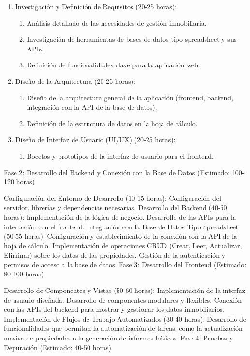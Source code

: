 \begin{enumerate}
    \item Investigación y Definición de Requisitos (20-25 horas):
    \begin{enumerate}
        \item Análisis detallado de las necesidades de gestión inmobiliaria.
        \item Investigación de herramientas de bases de datos tipo spreadsheet y sus APIs.
        \item Definición de funcionalidades clave para la aplicación web.
    \end{enumerate}
    \item Diseño de la Arquitectura (20-25 horas):
    \begin{enumerate}
    \item Diseño de la arquitectura general de la aplicación (frontend, backend, integración con la API de la base de datos).
    \item Definición de la estructura de datos en la hoja de cálculo.
    \end{enumerate}
    \item Diseño de Interfaz de Usuario (UI/UX) (20-25 horas):
    \begin{enumerate}
    \item Bocetos y prototipos de la interfaz de usuario para el frontend.
    \end{enumerate}
\end{enumerate}

Fase 2: Desarrollo del Backend y Conexión con la Base de Datos (Estimado: 100-120 horas)

Configuración del Entorno de Desarrollo (10-15 horas):
Configuración del servidor, librerías y dependencias necesarias.
Desarrollo del Backend (40-50 horas):
Implementación de la lógica de negocio.
Desarrollo de las APIs para la interacción con el frontend.
Integración con la Base de Datos Tipo Spreadsheet (50-55 horas):
Configuración y establecimiento de la conexión con la API de la hoja de cálculo.
Implementación de operaciones CRUD (Crear, Leer, Actualizar, Eliminar) sobre los datos de las propiedades.
Gestión de la autenticación y permisos de acceso a la base de datos.
Fase 3: Desarrollo del Frontend (Estimado: 80-100 horas)

Desarrollo de Componentes y Vistas (50-60 horas):
Implementación de la interfaz de usuario diseñada.
Desarrollo de componentes modulares y flexibles.
Conexión con las APIs del backend para mostrar y gestionar los datos inmobiliarios.
Implementación de Flujos de Trabajo Automatizados (30-40 horas):
Desarrollo de funcionalidades que permitan la automatización de tareas, como la actualización masiva de propiedades o la generación de informes básicos.
Fase 4: Pruebas y Depuración (Estimado: 40-50 horas)


